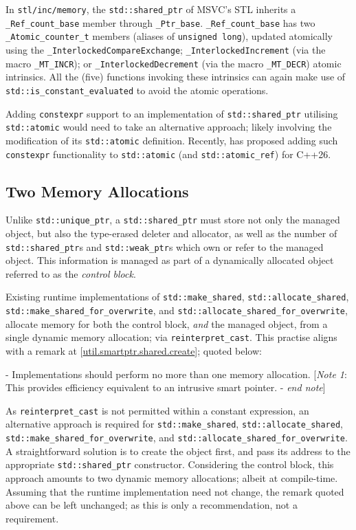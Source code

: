 \documentclass[10pt]{article}
\newcommand*{\wgxxi}[1]{[\href{https://wg21.link/#1}{#1}]}
\begin{document}
In \texttt{stl/inc/memory}, the \texttt{std::shared\_ptr} of MSVC's STL
inherits a \texttt{\_Ref\_count\_base} member through \texttt{\_Ptr\_base}.
\texttt{\_Ref\_count\_base} has two \texttt{\_Atomic\_counter\_t} members
(aliases of \texttt{unsigned long}), updated atomically using the
\texttt{\_InterlockedCompareExchange}; \texttt{\_InterlockedIncrement} (via the
macro \texttt{\_MT\_INCR}); or \texttt{\_InterlockedDecrement} (via the macro
\texttt{\_MT\_DECR}) atomic intrinsics. All the (five) functions invoking these
intrinsics can again make use of \texttt{std::is\_constant\_evaluated} to avoid
the atomic operations.

Adding \texttt{constexpr} support to an implementation of
\texttt{std::shared\_ptr} utilising \texttt{std::atomic} would need to take an
alternative approach; likely involving the modification of its
\texttt{std::atomic} definition. Recently, \cite{P3309R3} has proposed adding
such \texttt{constexpr} functionality to \texttt{std::atomic} (and
\texttt{std::atomic\_ref}) for C++26.

\subsection{Two Memory Allocations}

Unlike \texttt{std::unique\_ptr}, a \texttt{std::shared\_ptr} must store not
only the managed object, but also the type-erased deleter and allocator, as
well as the number of \texttt{std::shared\_ptr}s and \texttt{std::weak\_ptr}s
which own or refer to the managed object. This information is managed as part
of a dynamically allocated object referred to as the \emph{control block}.

Existing runtime implementations of \texttt{std::make\_shared},
\texttt{std::allocate\_shared}, \texttt{std::make\_shared\_for\_overwrite}, and
\texttt{std::allocate\_shared\_for\_overwrite}, allocate memory for both the
control block, \emph{and} the managed object, from a single dynamic memory
allocation; via \texttt{reinterpret\_cast}.  This practise aligns with a remark
at \wgxxi{util.smartptr.shared.create}; quoted below:

 - Implementations should perform no more than one memory allocation.\newline
\makebox[0pt][r]{\quad} \phantom{-} [\emph{Note 1}: This provides efficiency equivalent to an intrusive smart pointer.  - \emph{end note}]

As \texttt{reinterpret\_cast} is not permitted within a constant expression, an
alternative approach is required for \texttt{std::make\_shared},
\texttt{std::allocate\_shared}, \texttt{std::make\_shared\_for\_overwrite}, and
\texttt{std::allocate\_shared\_for\_overwrite}.  A straightforward solution is
to create the object first, and pass its address to the appropriate
\texttt{std::shared\_ptr} constructor. Considering the control block, this
approach amounts to two dynamic memory allocations; albeit at compile-time.
Assuming that the runtime implementation need not change, the remark quoted
above can be left unchanged; as this is only a recommendation, not a
requirement.
\end{document}
